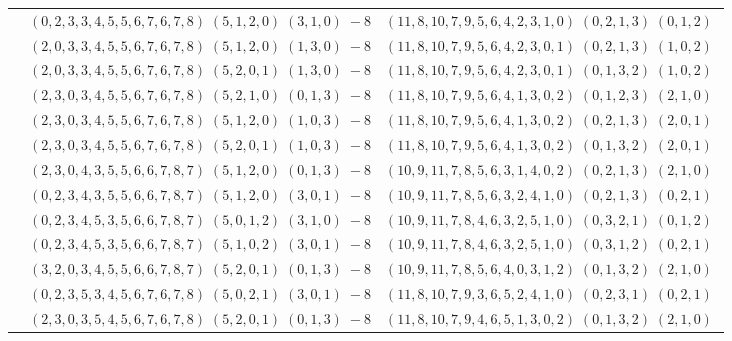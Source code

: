 \documentclass[11pt]{article}
\begin{document}
\begin{longtable}[l]{|c|c|c|}
 \cline{2-3} 
 & $(0 ,2 ,3 ,3 ,4 ,5 ,5 ,6 ,7 ,6 ,7 ,8) \;(5 ,1 ,2 ,0) \;(3 ,1 ,0) \;-8$ & $(11 ,8 ,10 ,7 ,9 ,5 ,6 ,4 ,2 ,3 ,1 ,0) \;(0 ,2 ,1 ,3) \;(0 ,1 ,2) \;$\\ 
 \cline{2-3} 
 & $(2 ,0 ,3 ,3 ,4 ,5 ,5 ,6 ,7 ,6 ,7 ,8) \;(5 ,1 ,2 ,0) \;(1 ,3 ,0) \;-8$ & $(11 ,8 ,10 ,7 ,9 ,5 ,6 ,4 ,2 ,3 ,0 ,1) \;(0 ,2 ,1 ,3) \;(1 ,0 ,2) \;$\\ 
 \cline{2-3} 
 & $(2 ,0 ,3 ,3 ,4 ,5 ,5 ,6 ,7 ,6 ,7 ,8) \;(5 ,2 ,0 ,1) \;(1 ,3 ,0) \;-8$ & $(11 ,8 ,10 ,7 ,9 ,5 ,6 ,4 ,2 ,3 ,0 ,1) \;(0 ,1 ,3 ,2) \;(1 ,0 ,2) \;$\\ 
 \cline{2-3} 
 & $(2 ,3 ,0 ,3 ,4 ,5 ,5 ,6 ,7 ,6 ,7 ,8) \;(5 ,2 ,1 ,0) \;(0 ,1 ,3) \;-8$ & $(11 ,8 ,10 ,7 ,9 ,5 ,6 ,4 ,1 ,3 ,0 ,2) \;(0 ,1 ,2 ,3) \;(2 ,1 ,0) \;$\\ 
 \cline{2-3} 
 & $(2 ,3 ,0 ,3 ,4 ,5 ,5 ,6 ,7 ,6 ,7 ,8) \;(5 ,1 ,2 ,0) \;(1 ,0 ,3) \;-8$ & $(11 ,8 ,10 ,7 ,9 ,5 ,6 ,4 ,1 ,3 ,0 ,2) \;(0 ,2 ,1 ,3) \;(2 ,0 ,1) \;$\\ 
 \cline{2-3} 
 & $(2 ,3 ,0 ,3 ,4 ,5 ,5 ,6 ,7 ,6 ,7 ,8) \;(5 ,2 ,0 ,1) \;(1 ,0 ,3) \;-8$ & $(11 ,8 ,10 ,7 ,9 ,5 ,6 ,4 ,1 ,3 ,0 ,2) \;(0 ,1 ,3 ,2) \;(2 ,0 ,1) \;$\\ 
 \cline{2-3} 
 & $(2 ,3 ,0 ,4 ,3 ,5 ,5 ,6 ,6 ,7 ,8 ,7) \;(5 ,1 ,2 ,0) \;(0 ,1 ,3) \;-8$ & $(10 ,9 ,11 ,7 ,8 ,5 ,6 ,3 ,1 ,4 ,0 ,2) \;(0 ,2 ,1 ,3) \;(2 ,1 ,0) \;$\\ 
 \cline{2-3} 
 & $(0 ,2 ,3 ,4 ,3 ,5 ,5 ,6 ,6 ,7 ,8 ,7) \;(5 ,1 ,2 ,0) \;(3 ,0 ,1) \;-8$ & $(10 ,9 ,11 ,7 ,8 ,5 ,6 ,3 ,2 ,4 ,1 ,0) \;(0 ,2 ,1 ,3) \;(0 ,2 ,1) \;$\\ 
 \cline{2-3} 
 & $(0 ,2 ,3 ,4 ,5 ,3 ,5 ,6 ,6 ,7 ,8 ,7) \;(5 ,0 ,1 ,2) \;(3 ,1 ,0) \;-8$ & $(10 ,9 ,11 ,7 ,8 ,4 ,6 ,3 ,2 ,5 ,1 ,0) \;(0 ,3 ,2 ,1) \;(0 ,1 ,2) \;$\\ 
 \cline{2-3} 
 & $(0 ,2 ,3 ,4 ,5 ,3 ,5 ,6 ,6 ,7 ,8 ,7) \;(5 ,1 ,0 ,2) \;(3 ,0 ,1) \;-8$ & $(10 ,9 ,11 ,7 ,8 ,4 ,6 ,3 ,2 ,5 ,1 ,0) \;(0 ,3 ,1 ,2) \;(0 ,2 ,1) \;$\\ 
 \cline{2-3} 
 & $(3 ,2 ,0 ,3 ,4 ,5 ,5 ,6 ,6 ,7 ,8 ,7) \;(5 ,2 ,0 ,1) \;(0 ,1 ,3) \;-8$ & $(10 ,9 ,11 ,7 ,8 ,5 ,6 ,4 ,0 ,3 ,1 ,2) \;(0 ,1 ,3 ,2) \;(2 ,1 ,0) \;$\\ 
 \cline{2-3} 
 & $(0 ,2 ,3 ,5 ,3 ,4 ,5 ,6 ,7 ,6 ,7 ,8) \;(5 ,0 ,2 ,1) \;(3 ,0 ,1) \;-8$ & $(11 ,8 ,10 ,7 ,9 ,3 ,6 ,5 ,2 ,4 ,1 ,0) \;(0 ,2 ,3 ,1) \;(0 ,2 ,1) \;$\\ 
 \cline{2-3} 
 & $(2 ,3 ,0 ,3 ,5 ,4 ,5 ,6 ,7 ,6 ,7 ,8) \;(5 ,2 ,0 ,1) \;(0 ,1 ,3) \;-8$ & $(11 ,8 ,10 ,7 ,9 ,4 ,6 ,5 ,1 ,3 ,0 ,2) \;(0 ,1 ,3 ,2) \;(2 ,1 ,0) \;$\\ 

\end{longtable}
\end{document}

